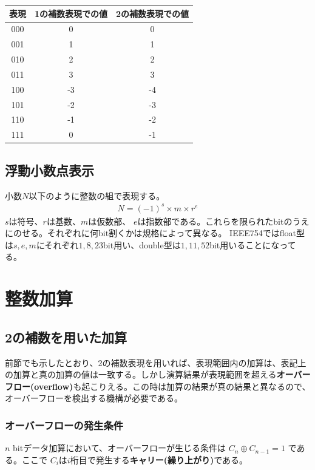 \documentclass[a4j,10pt,oneside,openany,fleqn]{jsbook}
\begin{document}
\begin{table}[htb]
  \begin{center}
    \begin{tabular}{c|cc} 
      表現 & 1の補数表現での値 & 2の補数表現での値 \\ \hline 
      000  & 0 & 0 \\ 
      001  & 1 & 1 \\ 
      010  & 2 & 2 \\ 
      011  & 3 & 3 \\ 
      100  & -3 & -4 \\ 
      101  & -2 & -3 \\ 
      110  & -1 & -2 \\ 
      111  & 0 & -1 \\ 
    \end{tabular}
  \end{center}
\end{table}

\subsection{浮動小数点表示}
小数$N$以下のように整数の組で表現する。
\begin{align*}
  N = (-1)^s \times m \times r^e
\end{align*}
$s$は符号、$r$は基数、$m$は仮数部、 $e$は指数部である。これらを限られたbitのうえにのせる。それぞれに何bit割くかは規格によって異なる。
IEEE754ではfloat型は$s, e, m$にそれぞれ$1,8,23$bit用い、double型は$1, 11, 52$bit用いることになってる。

\section{整数加算}
\subsection{2の補数を用いた加算}
前節でも示したとおり、2の補数表現を用いれば、表現範囲内の加算は、表記上の加算と真の加算の値は一致する。しかし演算結果が表現範囲を超える\textbf{オーバーフロー(overflow)}も起こりえる。この時は加算の結果が真の結果と異なるので、オーバーフローを検出する機構が必要である。

\subsubsection{オーバーフローの発生条件}
$n$ bitデータ加算において、オーバーフローが生じる条件は $C_n \oplus C_{n-1} = 1$ である。ここで $C_i$は$i$桁目で発生する\textbf{キャリー(繰り上がり)}である。
\end{document}
